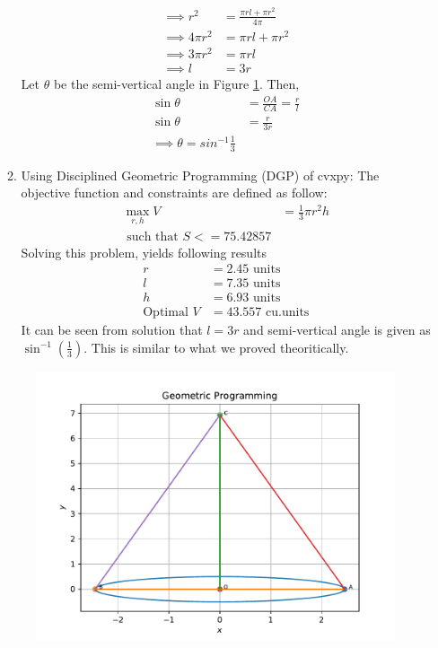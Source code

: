 \documentclass[12pt]{article}
\providecommand{\brak}[1]{\ensuremath{\left(#1\right)}}
\begin{document}
\begin{enumerate}
\begin{enumerate}
\begin{align}
	\implies r^2 &= \frac{\pi rl+\pi r^2}{4\pi} \\
	\implies 4\pi r^2 &= \pi rl+ \pi r^2 \\
        \implies 3\pi r^2 &= \pi rl \\
	\implies l &= 3r 
\end{align}
Let $\theta$ be the semi-vertical angle in Figure \ref{fig:Fig1}. Then,
\begin{align}
	\sin\theta &= \frac{OA}{CA} = \frac{r}{l} \\
	\sin\theta &= \frac{r}{3r} \\
	\implies \theta = sin^{-1}\frac{1}{3}
\end{align}
\item Using Disciplined Geometric Programming (DGP) of cvxpy: The objective function and constraints are defined as follow:
\begin{align}
	\max_{r,h} V &= \frac{1}{3}\pi r^2h \\
	\text { such that } S <= 75.42857 
\end{align}
Solving this problem, yields following results
\begin{align}
	r &= 2.45 \text{ units} \\
	l &= 7.35 \text{ units} \\
	h &= 6.93 \text{ units} \\
	\text{Optimal } V &= 43.557 \text{ cu.units} 
\end{align}
It can be seen from solution that $l = 3r$ and semi-vertical angle is given as $\sin^{-1}\brak{\frac{1}{3}}$. This is similar to what we proved theoritically.
\end{enumerate}
\begin{figure}[!h]
	\begin{center}
		\includegraphics[width=\columnwidth]{figs/problem26.pdf}
	\end{center}
\caption{}
\label{fig:Fig1}
\end{figure}
\end{enumerate}
\end{document}
